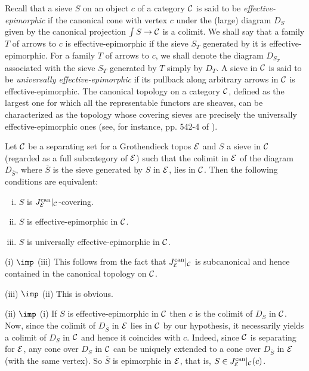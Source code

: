\documentclass[a4paper,12pt]{article}
\begin{document}
Recall that a sieve $S$ on an object $c$ of a category $\cal C$ is said to be \emph{effective-epimorphic} if the canonical cone with vertex $c$ under
the (large) diagram $D_{S}$ given by the canonical projection ${\int S}\to {\cal C}$ is a colimit. We shall say that a family $T$ of arrows to $c$ is effective-epimorphic if the sieve $S_{T}$ generated by it is effective-epimorphic. For a family $T$ of arrows to $c$, we shall denote the diagram $D_{S_{T}}$ associated with the sieve $S_{T}$ generated by $T$ simply by $D_{T}$. A sieve in $\cal C$ is said to be \emph{universally effective-epimorphic} if its pullback along arbitrary arrows in $\cal C$ is effective-epimorphic. The canonical topology on a category $\cal C$, defined as the largest one for which all the representable functors are sheaves, can be characterized as the topology whose covering sieves are precisely the universally effective-epimorphic ones (see, for instance, pp. 542-4 of \cite{El}).  

\begin{lemma}\label{lemmainducedcanonicaltopology}
	Let $\cal C$ be a separating set for a Grothendieck topos $\cal E$ and  $S$ a sieve in $\cal C$ (regarded as a full subcategory of $\cal E$) such that the colimit in $\cal E$ of the diagram $D_{\overline{S}}$, where $\overline{S}$ is the sieve generated by $S$ in $\cal E$, lies in $\cal C$. Then the following conditions are equivalent:
	\begin{enumerate}[(i)]
		\item $S$ is $J_{\cal E}^{\textup{can}}|_{\cal C}$-covering. 
		
		\item $S$ is effective-epimorphic in $\cal C$.
		
		\item $S$ is universally effective-epimorphic in $\cal C$.
	\end{enumerate} 
\end{lemma}

\begin{proofs}
	(i) $\imp$ (iii) This follows from the fact that $J_{\cal E}^{\textup{can}}|_{\cal C}$ is subcanonical and hence contained in the canonical topology on $\cal C$.
	
	(iii) $\imp$ (ii) This is obvious.
	
	(ii) $\imp$ (i) If $S$ is effective-epimorphic in $\cal C$ then $c$ is the colimit of $D_{S}$ in $\cal C$. Now, since the colimit of $D_{\overline{S}}$ in $\cal E$ lies in $\cal C$ by our hypothesis, it necessarily yields a colimit of $D_{S}$ in $\cal C$ and hence it coincides with $c$. Indeed, since $\cal C$ is separating for $\cal E$, any cone over $D_{S}$ in $\cal C$ can be uniquely extended to a cone over $D_{\overline{S}}$ in $\cal E$ (with the same vertex). So $\overline{S}$ is epimorphic in $\cal E$, that is, $S\in J_{\cal E}^{\textup{can}}|_{\cal C}(c)$.
\end{proofs}
\end{document}
